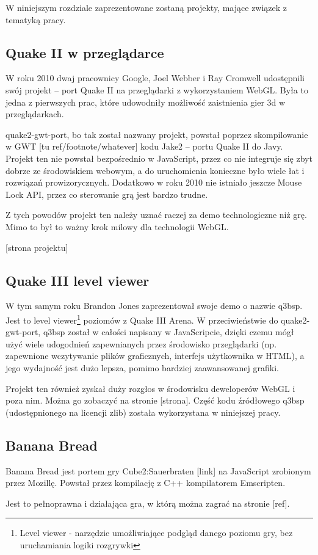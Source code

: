 W niniejszym rozdziale zaprezentowane zostaną projekty, mające związek z tematyką pracy.

\subsection{Quake II w przeglądarce}
\label{ssec:quake2web}

W roku 2010 dwaj pracownicy Google, Joel Webber i Ray Cromwell
udostępnili swój projekt -- port Quake II
na przeglądarki z wykorzystaniem WebGL. Była to jedna z pierwszych prac,
które udowodniły możliwość zaistnienia gier 3d w przeglądarkach.

quake2-gwt-port, bo tak został nazwany projekt, powstał poprzez skompilowanie
w GWT [tu ref/footnote/whatever] kodu Jake2 -- portu Quake II do Javy.
Projekt ten nie powstał bezpośrednio w JavaScript, przez co nie integruje się
zbyt dobrze ze środowiskiem webowym, a do uruchomienia konieczne było
wiele łat i rozwiązań prowizorycznych. Dodatkowo w roku 2010 nie istniało
jeszcze Mouse Lock API, przez co sterowanie grą jest bardzo trudne.

Z tych powodów projekt ten należy uznać raczej za demo technologiczne niż
grę. Mimo to był to ważny krok milowy dla technologii WebGL.

[strona projektu]

\subsection{Quake III level viewer}
\label{ssec:quake3web}

W tym samym roku Brandon Jones zaprezentował swoje demo o nazwie q3bsp.
Jest to level viewer\footnote{Level viewer - narzędzie umożliwiające
  podgląd danego poziomu gry, bez uruchamiania logiki rozgrywki} poziomów
z Quake III Arena. W przeciwieństwie do quake2-gwt-port, q3bsp został
w całości napisany w JavaScripcie, dzięki czemu mógł użyć wiele udogodnień
zapewnianych przez środowisko przeglądarki (np. zapewnione wczytywanie
plików graficznych, interfejs użytkownika w HTML), a jego wydajność
jest dużo lepsza, pomimo bardziej zaawansowanej grafiki.

Projekt ten również zyskał duży rozgłos w środowisku deweloperów WebGL
i poza nim. Można go zobaczyć na stronie [strona]. Część kodu źródłowego
q3bsp (udostępnionego na licencji zlib) została wykorzystana w niniejszej pracy.

\subsection{Banana Bread}
\label{ssec:bananaBread}

Banana Bread jest portem gry Cube2:Sauerbraten [link] na JavaScript zrobionym
przez Mozillę. Powstał przez kompilację z C++ kompilatorem Emscripten.

Jest to pełnoprawna i działająca gra, w którą można zagrać na stronie [ref].


